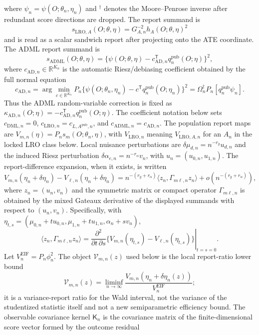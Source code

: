 \documentclass[11pt]{article}
\newcommand{\transpose}{\mathsf{T}}
\newcommand{\R}{\mathbb{R}}
\theoremstyle{definition}
\theoremstyle{plain}
\theoremstyle{remark}
\begin{document}
where \(\psi_n=\psi(O;\theta_n,\eta_n)\) and \({}^\dagger\) denotes the
Moore--Penrose inverse after redundant score directions are dropped.  The report
summand is
\[
s_{\mathrm{LRO},A}(O;\theta,\eta)
  =G_{A,n}^{-2}h_A(O;\theta,\eta)^2
\]
and is read as a scalar sandwich report after projecting onto the ATE coordinate.
The ADML report summand is
\[
s_{\mathrm{ADML}}(O;\theta,\eta)
  =\{\psi(O;\theta,\eta)-c_{\mathrm{AD},n}^{\transpose}
       q^{\mathrm{pub}}_n(O;\eta)\}^2,
\]
where \(c_{\mathrm{AD},n}\in\R^{K_n}\) is the automatic Riesz/debiasing
coefficient obtained by the full normal equation
\[
c_{\mathrm{AD},n}
=\arg\min_{c\in\R^{K_n}}P_n\{\psi(O;\theta_n,\eta_n)-
c^{\transpose}q^{\mathrm{pub}}_n(O;\eta_n)\}^2
=\Omega_n^\dagger P_n[q^{\mathrm{pub}}_n\psi_n].
\]
Thus the ADML random-variable correction is fixed as
\(\kappa_{\mathrm{AD},n}(O;\eta)=-c_{\mathrm{AD},n}^{\transpose}
q^{\mathrm{pub}}_n(O;\eta)\).  The
coefficient notation below sets \(c_{\mathrm{DML},n}=0\),
\(c_{\mathrm{LRO},n}=c_{L,A^{\mathrm{pub}},n}\), and
\(c_{\mathrm{ADML},n}=c_{\mathrm{AD},n}\).
The population report maps are \(V_{m,n}(\eta)=P_n s_{m}(O;\theta_n,\eta)\), with
\(V_{\mathrm{LRO},n}\) meaning \(V_{\mathrm{LRO},A,n}\) for an \(A_n\) in the
locked LRO class below.  Local nuisance perturbations are
\(\delta\mu_{d,n}=n^{-r_g}u_{d,n}\) and the induced Riesz perturbation
\(\delta\alpha_{e,n}=n^{-r_\alpha}v_n\), with
\(u_n=(u_{0,n},u_{1,n})\).  The
report-difference expansion, when it exists, is written
\[
V_{m,n}(\eta_n+\delta\eta_n)-V_{\ell,n}(\eta_n+\delta\eta_n)
= n^{-(r_g+r_\alpha)}
  \langle z_n,\Gamma_{m\ell,n}z_n\rangle + o(n^{-(r_g+r_\alpha)}),
\]
where \(z_n=(u_n,v_n)\) and the symmetric matrix or compact operator
\(\Gamma_{m\ell,n}\) is obtained by the mixed Gateaux derivative of the
displayed summands with respect to \((u_n,v_n)\).  Specifically, with
\(\eta_{t,s}=(\mu_{0,n}+tu_{0,n},\mu_{1,n}+tu_{1,n},
\alpha_n+sv_n)\),
\[
\langle z_n,\Gamma_{m\ell,n}z_n\rangle
=\left.
\frac{\partial^2}{\partial t\,\partial s}
\{V_{m,n}(\eta_{t,s})-V_{\ell,n}(\eta_{t,s})\}
\right|_{t=s=0}.
\]
Let \(V^{\mathrm{EIF}}_n=P_n\phi_n^2\).  The object
\(\mathcal V_{m,n}(z)\) used below is the local report-ratio lower bound
\[
\mathcal V_{m,n}(z)
=\liminf_{n\to\infty}
\frac{V_{m,n}(\eta_n+\delta\eta_n(z))}{V^{\mathrm{EIF}}_n};
\]
it is a variance-report ratio for the Wald interval, not the variance of the
studentized statistic itself and not a new semiparametric efficiency bound.
The observable covariance kernel \(\mathsf K_n\) is the covariance matrix of the
finite-dimensional score vector formed by the outcome residual
\end{document}
